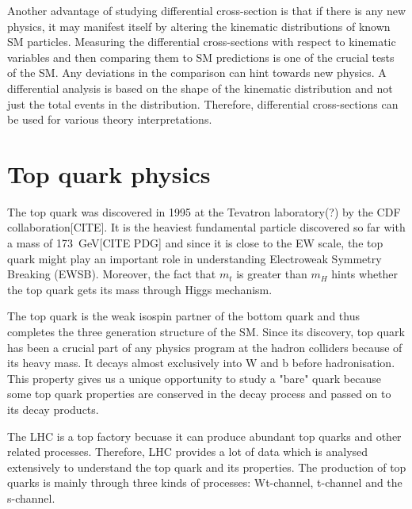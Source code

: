 Another advantage of studying differential cross-section is that if there is any new physics,
it may manifest itself by altering the kinematic distributions of known SM particles. Measuring the 
differential cross-sections with respect to kinematic variables and then comparing them to SM predictions
is one of the crucial tests of the SM. Any deviations in the comparison can hint towards new physics.
A differential analysis is based on the shape of the kinematic distribution and not just the 
total events in the distribution. Therefore, differential cross-sections can be used for various
theory interpretations.

\section{Top quark physics}
The top quark was discovered in 1995 at the Tevatron laboratory(?) by the CDF collaboration[CITE].
It is the heaviest fundamental particle discovered so far with a mass of \SI{173}{\GeV}[CITE PDG] 
and since it is close to the EW scale, the top quark might play an important role in understanding
Electroweak Symmetry Breaking (EWSB). Moreover, the fact that $m_t$ is greater than $m_H$ hints whether
the top quark gets its mass through Higgs mechanism.  

The top quark is the weak isospin partner of the bottom quark and thus completes the three 
generation structure of the SM. Since its discovery, top quark has been a crucial part of
any physics program at the hadron colliders because of its heavy mass. It decays almost exclusively
into W and b before hadronisation. This property gives us a unique opportunity to study a "bare"
quark because some top quark properties are conserved in the decay process and passed on to 
its decay products.

The LHC is a top factory becuase it can produce abundant top quarks and other related processes.
Therefore, LHC provides a lot of data which is analysed extensively to understand the top quark and
its properties. The production of top quarks is mainly through three kinds of processes: Wt-channel,
t-channel and the s-channel.









